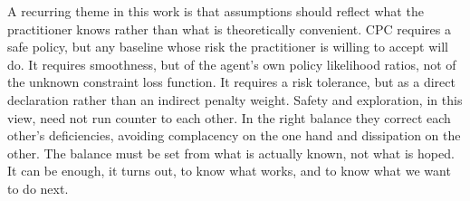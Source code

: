 A recurring theme in this work is that assumptions should reflect what the practitioner knows rather than what is theoretically convenient. CPC requires a safe policy, but any baseline whose risk the practitioner is willing to accept will do. It requires smoothness, but of the agent's own policy likelihood ratios, not of the unknown constraint loss function. It requires a risk tolerance, but as a direct declaration rather than an indirect penalty weight. Safety and exploration, in this view, need not run counter to each other. In the right balance they correct each other's deficiencies, avoiding complacency on the one hand and dissipation on the other. The balance must be set from what is actually known, not what is hoped. It can be enough, it turns out, to know what works, and to know what we want to do next.



